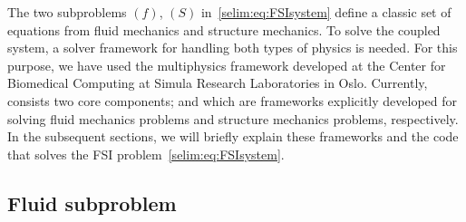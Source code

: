 The two subproblems $(f)$, $(S)$ in~\eqref{selim:eq:FSIsystem} define
a classic set of equations from fluid mechanics and structure
mechanics. To solve the coupled system, a solver framework for
handling both types of physics is needed. For this purpose, we have
used the multiphysics framework  developed at the
Center for Biomedical Computing at Simula Research Laboratories in
Oslo. Currently,  consists two core components;
 and  which are frameworks
explicitly developed for solving fluid mechanics problems and
structure mechanics problems, respectively.  In the subsequent
sections, we will briefly explain these frameworks and the code that
solves the FSI problem~\eqref{selim:eq:FSIsystem}.

\subsection{Fluid subproblem}

